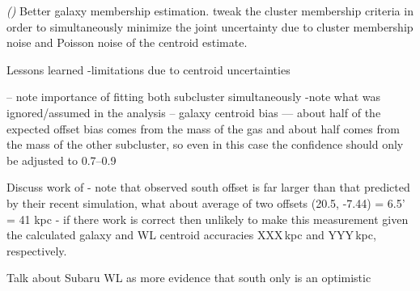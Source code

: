 \textit{()} Better galaxy membership estimation.
tweak the cluster membership criteria in order to simultaneously minimize the joint uncertainty due to cluster membership noise and Poisson noise of the centroid estimate.
 

Lessons learned 
-limitations due to centroid uncertainties


-- note importance of fitting both subcluster simultaneously
-note what was ignored/assumed in the analysis
-- galaxy centroid bias
--- about half of the expected offset bias comes from the mass of the gas and about half comes from the mass of the other subcluster, so even in this case the confidence should only be adjusted to 0.7--0.9



Discuss work of \citep{Kahlhoefer:2013wp}
- note that observed south offset is far larger than that predicted by their recent simulation, what about average of two offsets (20.5, -7.44) = 6.5' = 41 kpc
- if there work is correct then unlikely to make this measurement given the calculated galaxy and WL centroid accuracies XXX\,kpc and YYY\,kpc, respectively.





Talk about Subaru WL as more evidence that south only is an optimistic


%



%
%  
